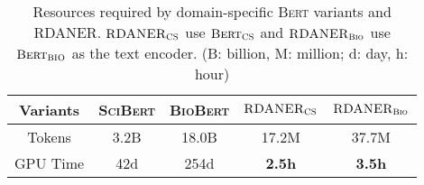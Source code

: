 \documentclass[10pt, conference, compsocconf]{IEEEtran}
\newcommand{\bert}{\textsc{Bert}\xspace}
\newcommand{\scibert}{\textsc{SciBert}\xspace}
\newcommand{\biobert}{\textsc{BioBert}\xspace}
\newcommand{\Scierc}{\textsc{S}ci-\textsc{erc}\xspace}
\newcommand{\rdaner}{\textsc{RDANER}\xspace}
\newcommand{\bertcs}{$\bert_{\textsc{CS}}$\xspace}
\newcommand{\bertbio}{$\bert_{\textsc{BIO}}$\xspace}
\newcommand{\rdanercs}{$\rdaner_{\textsc{CS}}$\xspace}
\newcommand{\rdanerbio}{$\rdaner_{\textsc{Bio}}$\xspace}
\newcommand{\bertbase}{$\bert_{\textsc{Base}}$\xspace}
\begin{document}
    \begin{table}[t!]
        \caption{Resources required by domain-specific \bert variants and \rdaner. 
        \rdanercs use \bertcs and \rdanerbio use \bertbio as the text encoder.
        (B: billion, M: million; d: day, h: hour)}
        \label{tal:pre-trained-models}
        \centering
        \setlength{\tabcolsep}{5.5pt}
        \begin{tabular}{c|cc|cc}
            \toprule
    
            Variants & \scibert & \biobert  & \rdanercs & \rdanerbio  \\
            \hline
            Tokens & 3.2B & 18.0B & 17.2M & 37.7M \\
            GPU Time  & 42d & 254d & \textbf{2.5h}  & \textbf{3.5h}\\
    
            \bottomrule
        \end{tabular}
    \end{table}
    
\end{document}
